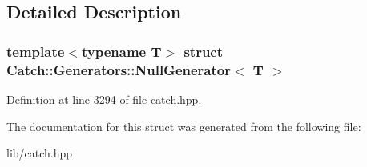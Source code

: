 \subsection{Detailed Description}
\subsubsection*{template$<$typename T$>$\newline
struct Catch\+::\+Generators\+::\+Null\+Generator$<$ T $>$}



Definition at line \mbox{\hyperlink{catch_8hpp_source_l03294}{3294}} of file \mbox{\hyperlink{catch_8hpp_source}{catch.\+hpp}}.



The documentation for this struct was generated from the following file\+:\begin{DoxyCompactItemize}
\item 
lib/catch.\+hpp\end{DoxyCompactItemize}
